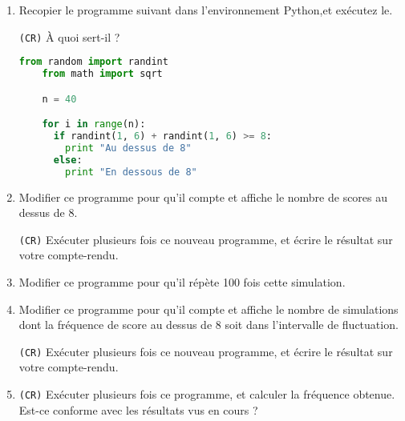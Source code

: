 \documentclass{article}
\newcommand\CR{\texttt{(CR)}}
\begin{document}
\begin{enumerate}
  \item Recopier le programme suivant dans l'environnement Python,et exécutez le.

    \CR{} À quoi sert-il ?

    \begin{lstlisting}[language=python,frame=lines,mathescape=true]
    from random import randint
    from math import sqrt

    n = 40

    for i in range(n):
      if randint(1, 6) + randint(1, 6) >= 8:
        print "Au dessus de 8"
      else:
        print "En dessous de 8"
    \end{lstlisting}

  \item Modifier ce programme pour qu'il compte et affiche le nombre de scores au dessus de 8.

    \CR{} Exécuter plusieurs fois ce nouveau programme, et écrire le résultat sur votre compte-rendu.
  \item Modifier ce programme pour qu'il répète 100 fois cette simulation.
  \item Modifier ce programme pour qu'il compte et affiche le nombre de simulations dont la fréquence de score au dessus de 8 soit dans l'intervalle de fluctuation.

    \CR{} Exécuter plusieurs fois ce nouveau programme, et écrire le résultat sur votre compte-rendu.
  \item \CR{} Exécuter plusieurs fois ce programme, et calculer la fréquence obtenue. Est-ce conforme avec les résultats vus en cours ?
\end{enumerate}
\end{document}
